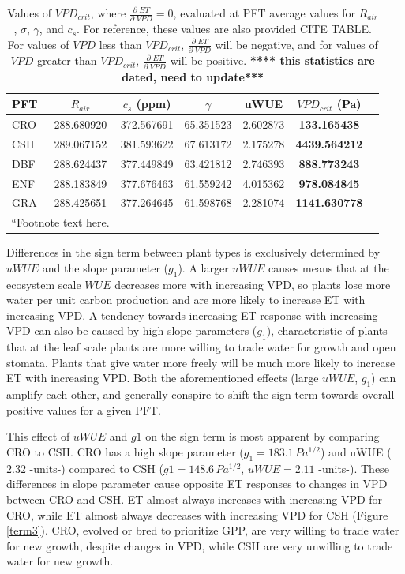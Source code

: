 \documentclass[draft,linenumbers]{agujournal}
\begin{document}
\begin{table}  
\caption{Values of $VPD_{crit}$, where $\frac{\partial \; ET}{\partial \; VPD} = 0$, evaluated at PFT average values for $R_{air}$, $\sigma$, $\gamma$, and $c_s$. For reference, these values are also provided CITE TABLE. For values of $VPD$ less than $VPD_{crit}$, $\frac{\partial \; ET}{\partial \; VPD}$ will be negative, and for values of $VPD$ greater than $VPD_{crit}$, $\frac{\partial \; ET}{\partial \; VPD}$ will be positive. \textbf{**** this statistics are dated, need to update***}}
\centering
\begin{tabular}{l c c c c c c}
  \hline
  PFT & $R_{air}$ & $c_s$ (ppm) & $\gamma$ &  uWUE    & \textbf{$VPD_{crit}$ (Pa)} \\
  \hline
  CRO &  288.680920 & 372.567691& 65.351523& 2.602873&  \textbf{133.165438} \\
  CSH &   289.067152& 381.593622& 67.613172& 2.175278& \textbf{4439.564212} \\
  DBF &   288.624437& 377.449849& 63.421812& 2.746393&  \textbf{888.773243} \\
  ENF &  288.183849& 377.676463& 61.559242& 4.015362&  \textbf{978.084845} \\
  GRA &  288.425651& 377.264645& 61.598768& 2.281074& \textbf{1141.630778} \\
\hline
\multicolumn{2}{l}{$^{a}$Footnote text here.}
\end{tabular}
\label{vpd_crit}
\end{table}

Differences in the sign term between plant types is exclusively determined by $uWUE$ and the slope parameter ($g_1$). A larger $uWUE$ causes means that at the ecosystem scale $WUE$ decreases more with increasing VPD, so plants lose more water per unit carbon production and are more likely to increase ET with increasing VPD. A tendency towards increasing ET response with increasing VPD can also be caused by high slope parameters ($g_1$), characteristic of plants that at the leaf scale plants are more willing to trade water for growth and open stomata. Plants that give water more freely will be much more likely to increase ET with increasing VPD.  Both the aforementioned effects (large $uWUE$, $g_1$) can amplify each other, and generally conspire to shift the sign term towards overall positive values for a given PFT.

This effect of $uWUE$ and $g1$ on the sign term is most apparent by comparing CRO to CSH. CRO has a high slope parameter ($g_1 = 183.1 \, Pa^{1/2}$) and uWUE ($2.32$ -units-) compared to CSH ($g1 = 148.6 \, Pa^{1/2}$, $uWUE=2.11$ -units-). These differences in slope parameter cause opposite ET responses to changes in VPD between CRO and CSH. ET almost always increases with increasing VPD for CRO, while ET almost always decreases with increasing VPD for CSH (Figure \ref{term3}). CRO, evolved or bred to prioritize GPP, are very willing to trade water for new growth, despite changes in VPD, while CSH are very unwilling to trade water for new growth.
\end{document}

